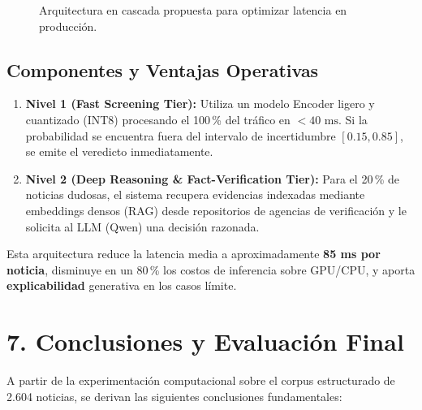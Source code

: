 \begin{figure}[H]
\caption{Arquitectura en cascada propuesta para optimizar latencia en producción.}
\label{fig:arquitectura-cascada}
\end{figure}

\subsection*{Componentes y Ventajas Operativas}

\begin{enumerate}
    \item \textbf{Nivel 1 (Fast Screening Tier):} Utiliza un modelo Encoder ligero y cuantizado (INT8) procesando el 100\,\% del tráfico en $< 40\text{ ms}$. Si la probabilidad se encuentra fuera del intervalo de incertidumbre $[0.15, 0.85]$, se emite el veredicto inmediatamente.
    \item \textbf{Nivel 2 (Deep Reasoning \& Fact-Verification Tier):} Para el 20\,\% de noticias dudosas, el sistema recupera evidencias indexadas mediante embeddings densos (RAG) desde repositorios de agencias de verificación y le solicita al LLM (Qwen) una decisión razonada.
\end{enumerate}

Esta arquitectura reduce la latencia media a aproximadamente \textbf{85 ms por noticia}, disminuye en un 80\,\% los costos de inferencia sobre GPU/CPU, y aporta \textbf{explicabilidad} generativa en los casos límite.


\section*{7. Conclusiones y Evaluación Final}

A partir de la experimentación computacional sobre el corpus estructurado de 2.604 noticias, se derivan las siguientes conclusiones fundamentales:

